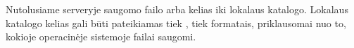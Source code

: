\documentclass[letterpaper,10pt,lithuanian]{sphinxmanual}
\begin{document}
\begin{fulllineitems}

\pysigstartsignatures
\pysigline
{}
\pysigstopsignatures
\sphinxAtStartPar
Nutolusiame serveryje saugomo failo {\hyperref[\detokenize{savokos:term-URI}]{}} arba kelias iki lokalaus
katalogo. Lokalaus katalogo kelias gali būti pateikiamas tiek {\hyperref[\detokenize{savokos:term-POSIX}]{}},
tiek {\hyperref[\detokenize{savokos:term-DOS}]{}} formatais, priklausomai nuo to, kokioje operacinėje
sistemoje failai saugomi.

\end{fulllineitems}
\end{document}
